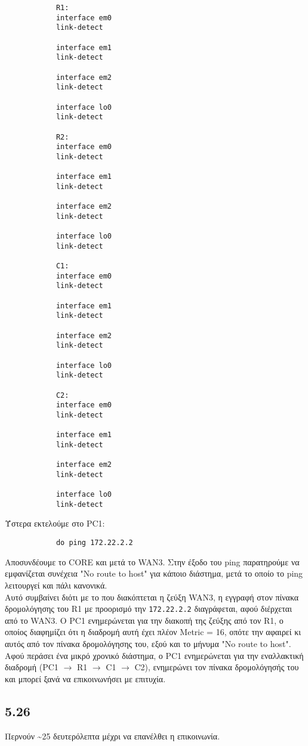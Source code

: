 \documentclass[a4paper, 12pt]{article}
\begin{document}
		\begin{verbatim}
			R1:
			interface em0
			link-detect
			
			interface em1
			link-detect
			
			interface em2
			link-detect
			
			interface lo0
			link-detect
			
			R2:
			interface em0
			link-detect
			
			interface em1
			link-detect
			
			interface em2
			link-detect
			
			interface lo0
			link-detect
			
			C1:
			interface em0
			link-detect
			
			interface em1
			link-detect
			
			interface em2
			link-detect
			
			interface lo0
			link-detect
			
			C2:
			interface em0
			link-detect
			
			interface em1
			link-detect
			
			interface em2
			link-detect
			
			interface lo0
			link-detect
		\end{verbatim}
		
		Ύστερα εκτελούμε στο PC1:
		
		\begin{verbatim}
			do ping 172.22.2.2
		\end{verbatim}
		
		Αποσυνδέουμε το CORE και μετά το WAN3. Στην έξοδο του ping παρατηρούμε να εμφανίζεται συνέχεια "No route to host" για κάποιο διάστημα, μετά το οποίο το ping λειτουργεί και πάλι κανονικά. \\
		
		Αυτό συμβαίνει διότι με το που διακόπτεται η ζεύξη WAN3, η εγγραφή στον πίνακα δρομολόγησης του R1 με προορισμό την \verb|172.22.2.2| διαγράφεται, αφού διέρχεται από το WAN3. Ο PC1 ενημερώνεται για την διακοπή της ζεύξης από τον R1, ο οποίος διαφημίζει ότι η διαδρομή αυτή έχει πλέον Metric = 16, οπότε την αφαιρεί κι αυτός από τον πίνακα δρομολόγησης του, εξού και το μήνυμα "No route to host". Αφού περάσει ένα μικρό χρονικό διάστημα, ο PC1 ενημερώνεται για την εναλλακτική διαδρομή (PC1 $\rightarrow$ R1 $\rightarrow$ C1 $\rightarrow$ C2), ενημερώνει τον πίνακα δρομολόγησής του και μπορεί ξανά να επικοινωνήσει με επιτυχία.

	\subsection*{5.26}
		Περνούν \textasciitilde25 δευτερόλεπτα μέχρι να επανέλθει η επικοινωνία.
\end{document}
